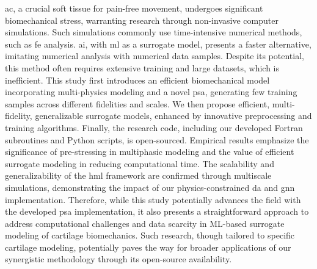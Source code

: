 \Ac{ac}, a crucial soft tissue for pain-free movement, undergoes significant biomechanical stress, warranting research through non-invasive computer simulations. Such simulations commonly use time-intensive numerical methods, such as \ac{fe} analysis. \Ac{ai}, with \ac{ml} as a surrogate model, presents a faster alternative, imitating numerical analysis with numerical data samples. Despite its potential, this method often requires extensive training and large datasets, which is inefficient. This study first introduces an efficient biomechanical model incorporating multi-physics modeling and a novel \ac{psa}, generating few training samples across different fidelities and scales. We then propose efficient, multi-fidelity, generalizable surrogate models, enhanced by innovative preprocessing and training algorithms. Finally, the research code, including our developed Fortran subroutines and Python scripts, is open-sourced. Empirical results emphasize the significance of pre-stressing in multiphasic modeling and the value of efficient surrogate modeling in reducing computational time. The scalability and generalizability of the \ac{hml} framework are confirmed through multiscale simulations, demonstrating the impact of our physics-constrained \ac{da} and \ac{gnn} implementation. Therefore, while this study potentially advances
the field with the developed \ac{psa} implementation, it also presents a straightforward approach to address computational challenges and data scarcity in ML-based surrogate modeling of cartilage biomechanics. Such research, though tailored to specific cartilage modeling, potentially paves the way for broader applications of our synergistic methodology through its open-source availability.







